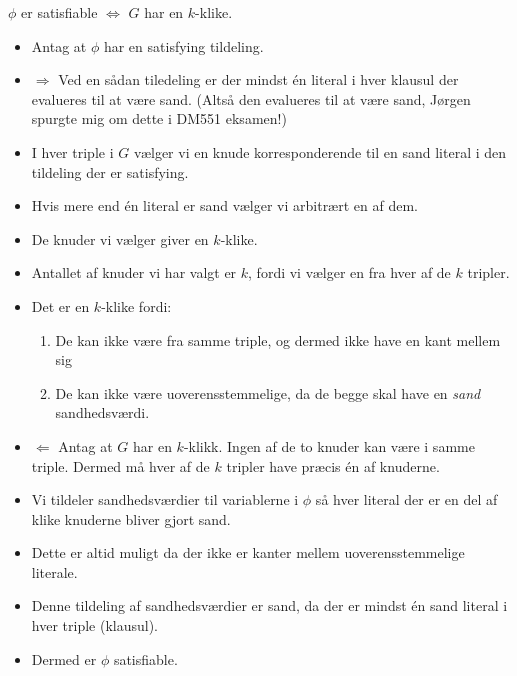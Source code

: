 \begin{frame}[allowframebreaks]
	\begin{theorem}
		$\phi$  er satisfiable $\iff$ $G$ har en $k$-klike.
	\end{theorem}

	\begin{itemize}
		\item Antag at $\phi$ har en satisfying tildeling.
		\item \(\Rightarrow\) Ved en sådan tiledeling er der mindst én literal i hver klausul der evalueres til at være sand. (Altså den evalueres til at være sand, Jørgen spurgte mig om dette i DM551 eksamen!)
		\item I hver triple i $G$ vælger vi en knude korresponderende til en sand literal i den tildeling der er satisfying.
		\item Hvis mere end én literal er sand vælger vi arbitrært en af dem.
		\item De knuder vi vælger giver en $k$-klike.
		\item Antallet af knuder vi har valgt er $k$, fordi vi vælger en fra hver af de $k$ tripler.
		\item Det er en $k$-klike fordi:
		      \begin{enumerate}
			      \item De kan ikke være fra samme triple, og dermed ikke have en kant mellem sig
			      \item De kan ikke være uoverensstemmelige, da de begge skal have en \textit{sand} sandhedsværdi.
		      \end{enumerate}
		\item \(\Leftarrow\) Antag at $G$ har en $k$-klikk. Ingen af de to knuder kan være i samme triple. Dermed må hver af de $k$ tripler have præcis én af knuderne.
		\item Vi tildeler sandhedsværdier til variablerne i $\phi$ så hver literal  der er en del af klike knuderne bliver gjort sand.
		\item Dette er altid muligt da der ikke er kanter mellem uoverensstemmelige literale.
		\item Denne tildeling af sandhedsværdier er sand, da der er mindst én sand literal i hver triple (klausul).
		\item Dermed er $\phi$ satisfiable.
	\end{itemize}
\end{frame}

